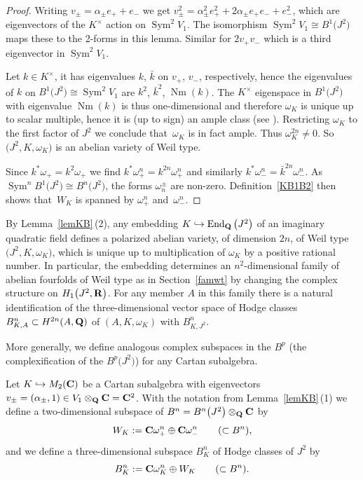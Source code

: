 \documentclass[10pt,a4paper]{amsart}
\numberwithin{equation}{section}
\begin{document}
\begin{proof}Writing $v_\pm=\alpha_\pm e_++e_-$ we get $v_\pm^2=\alpha_\pm^2e_+^2+2\alpha_\pm e_+e_-+e_-^2$,
which are eigenvectors of the $K^\times$ action on $\operatorname{Sym}^2V_1$.
The isomorphism $\operatorname{Sym}^2V_1\cong B^1\big(J^2\big)$ maps these to the 2-forms in this lemma. Similar for
$2v_+v_-$ which is a third eigenvector in $\operatorname{Sym}^2V_1$.

Let $k\in K^\times$, it has eigenvalues $k$, $\bar{k}$ on $v_+$, $v_-$, respectively,
hence the eigenvalues of $k$ on $B^1\big(J^2\big)\cong \operatorname{Sym}^2V_1$ are $k^2$, $\bar{k}^2$, $\operatorname{Nm}(k)$.
The $K^\times$ eigenspace in $B^1\big(J^2\big)$ with eigenvalue $\operatorname{Nm}(k)$ is thus one-dimensional
and therefore $\omega_K$ is unique up to scalar multiple, hence
it is (up to sign) an ample class (see \cite[Lemma~5.2]{vG}).
Restricting $\omega_K$ to the first factor of $J^2$ we conclude that~$\omega_K$ is in fact ample.
Thus $\omega_K^{2n}\neq 0$. So $\big(J^2,K,\omega_K\big)$
is an abelian variety of Weil type.

Since $k^*\omega_+ = k^{2}\omega_+$ we find
$k^*\omega^n_+=k^{2n}\omega_+^n$ and similarly
$k^*\omega^n_-=\bar{k}^{2n}\omega_-^n$.
As $\operatorname{Sym}^nB^1\big(J^2\big)\cong B^n\big(J^2\big)$, the forms $\omega_n^\pm$ are non-zero.
Definition~\ref{KB1B2} then shows that~$W_K$
is spanned by $\omega_+^{n}$ and~$\omega_-^n$.
\end{proof}

By Lemma~\ref{lemKB}\,(2),
any embedding $K\hookrightarrow \operatorname{End}_{\bf Q}\big(J^2\big)$ of an imaginary quadratic field
defines a polarized abelian variety, of dimension $2n$, of Weil type $\big(J^2,K,\omega_K\big)$,
which is unique up to multiplication of $\omega_K$ by a positive rational number.
In particular, the embedding determines an $n^2$-dimensional
family of abelian fourfolds of Weil type as in Section~\ref{famwt}
by changing the complex structure on $H_1\big(J^2,{\bf R}\big)$.
For any member $A$ in this family there is a natural identification of the
three-dimensional vector space of Hodge classes $B^n_{K,A}\subset H^{2n}(A,{\bf Q})$ of $(A,K,\omega_K)$
with $B^n_{K,J^2}$.

More generally, we define analogous complex subspaces in the $B^p$ (the complexification
of the $B^p\big(J^2\big)$) for any Cartan subalgebra.

\begin{Definition} \label{defBpK}
Let $K\hookrightarrow M_2({\bf C})$
be a Cartan subalgebra with eigenvectors $v_\pm=(\alpha_\pm,1) \in V_1\otimes_{\bf Q}{\bf C}={\bf C}^2$.
With the notation from Lemma~\ref{lemKB}\,(1)
we define a two-dimensional subspace of $B^n=B^n\big(J^2\big)\otimes_{\bf Q}{\bf C}$ by
\[
W_K := {\bf C} \omega_+^n \oplus {\bf C} \omega_-^n\qquad (\subset B^n),
\]
and we define a three-dimensional subspace $B^n_K$ of Hodge classes of $J^2$ by
\[
B^n_K := {\bf C}\omega_K^n \oplus W_K\qquad (\subset B^n).
\]
\end{Definition}
\end{document}
